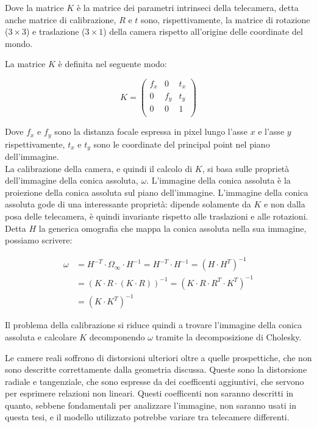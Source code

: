 Dove la matrice $K$ è la matrice dei parametri intrinseci della telecamera, detta anche matrice di calibrazione, $R$ e $t$ sono, rispettivamente, la matrice di rotazione ($3\times3$) e traslazione ($3\times1$) della camera rispetto all'origine delle coordinate del mondo.

La matrice $K$ è definita nel seguente modo:

\begin{equation*}
 K = \begin{pmatrix} f_x & 0 & t_x \\ 0 & f_y & t_y \\ 0 & 0 & 1 \\ \end{pmatrix} 
\end{equation*}

Dove $f_x$ e $f_y$ sono la distanza focale espressa in pixel lungo l'asse $x$ e l'asse $y$ rispettivamente, $t_x$ e $t_y$ sono le coordinate del principal point nel piano dell'immagine. \\

La calibrazione della camera, e quindi il calcolo di $K$, si basa sulle proprietà dell'immagine della conica assoluta, $\omega$.
L'immagine della conica assoluta è la proiezione della conica assoluta sul piano dell'immagine. L'immagine della conica assoluta gode di una interessante proprietà: dipende solamente da $K$ e non dalla posa delle telecamera, è quindi invariante rispetto alle traslazioni e alle rotazioni. Detta $H$ la generica omografia che mappa la conica assoluta nella sua immagine, possiamo scrivere:

\begin{equation*}
 \begin{split}
  \omega &= H^{-T}\cdot\Omega_\infty\cdot H^{-1} = H^{-T}\cdot H^{-1} = \left( H\cdot H^T \right)^{-1} \\
         &= \left( K\cdot R\cdot \left( K\cdot R \right)\right)^{-1} =  \left( K\cdot R\cdot R^T \cdot K^T \right)^{-1} \\
         &= \left( K\cdot K^T \right)^{-1}
 \end{split}
\end{equation*}

Il problema della calibrazione si riduce quindi a trovare l'immagine della conica assoluta e calcolare $K$ decomponendo $\omega$ tramite la decomposizione di Cholesky.

Le camere reali soffrono di distorsioni ulteriori oltre a quelle prospettiche, che non sono descritte correttamente dalla geometria discussa. Queste sono la distorsione radiale e tangenziale, che sono espresse da dei coefficenti aggiuntivi, che servono per esprimere relazioni non lineari. Questi coefficenti non saranno descritti in quanto, sebbene fondamentali per analizzare l'immagine, non saranno usati in questa tesi, e il modello utilizzato potrebbe variare tra telecamere differenti.



